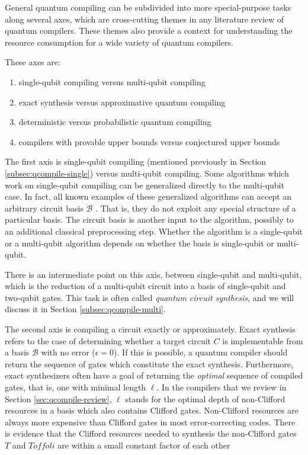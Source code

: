 General quantum compiling can be subdivided into more special-purpose tasks along several axes,
which are cross-cutting themes in any literature review of quantum compilers.
These themes also provide a context for understanding the resource consumption
for a wide variety of quantum compilers.

These axes are:

\begin{enumerate}
\item single-qubit compiling versus multi-qubit compiling
\item exact synthesis versus approximative quantum compiling
\item deterministic versus probabilistic quantum compiling
\item compilers with provable upper bounds versus conjectured upper bounds
\end{enumerate}

The first axis is 
single-qubit compiling
(mentioned previously in Section \ref{subsec:qcompile-single}) versus
multi-qubit compiling. Some algorithms which work on single-qubit compiling
can be generalized directly to the multi-qubit case. In fact, all known
examples of these generalized algorithms can accept an arbitrary circuit
basis $\mathcal{B}$ \cite{Amy2012,Dawson2005,Fowler2011,Booth2012}.
That is, they do not exploit any special structure of
a particular basis. The circuit basis is another input to the algorithm,
possibly to an additional classical preprocessing step. Whether the algorithm
is a single-qubit or a multi-qubit algorithm depends on whether the basis
is single-qubit or multi-qubit.

There is an intermediate point on this axis, between single-qubit and multi-qubit,
which is the reduction of a multi-qubit circuit into a basis of
single-qubit and two-qubit gates. This task is often called \emph{quantum circuit synthesis},
and we will discuss it in Section \ref{subsec:qcompile-multi}.

The second axis is compiling a circuit exactly or approximately.
Exact synthesis refers to the case of determining whether a
target circuit $C$ is implementable from a basis $\mathcal{B}$
with no error ($\epsilon = 0$). If this is possible, a quantum compiler
should return the sequence of gates which constitute the exact
synthesis. Furthermore, exact synthesizers often have a goal of
returning the \emph{optimal} sequence of compiled gates, that is,
one with minimal length $\ell$. In the compilers that we review
in Section \ref{sec:qcompile-review}, $\ell$ stands for the optimal
depth of non-Clifford resources in a basis which also contains Clifford
gates. Non-Clifford resources are always more expensive than
Clifford gates in most error-correcting codes. There is evidence
that the Clifford resources needed to synthesis the non-Clifford gates $T$ and $Toffoli$
are within a small constant factor of each other \cite{Eastin2012,Jones2012}

